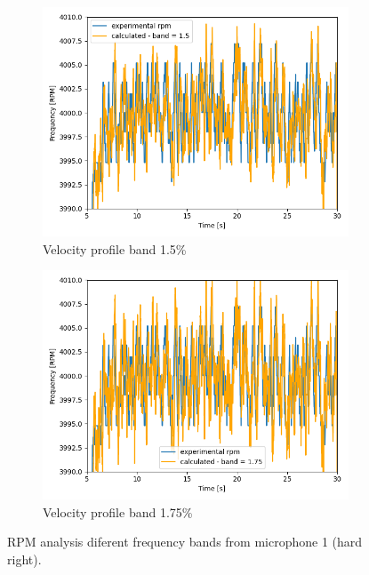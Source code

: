 \documentclass[10pt,fleqn,a4paper,twoside]{article}
\begin{document}
\begin{figure}[H]
\begin{subfigure}{0.4\textwidth}
        \includegraphics[width=\textwidth]{Figures/rpm_analysis_mic0_band_1.5.png}
        \caption{Velocity profile band 1.5\%}
        \label{fig:sixth}
    \end{subfigure}
    \centering
    \hfill
    \begin{subfigure}{0.4\textwidth}
        \includegraphics[width=\textwidth]{Figures/rpm_analysis_mic0_band_1.75.png}
        \caption{Velocity profile band 1.75\%}
        \label{fig:seventh}
    \end{subfigure}

            
    \caption{RPM analysis diferent frequency bands from microphone 1 (hard right).}
    \label{fig:figures}
    \end{figure}
\end{document}
